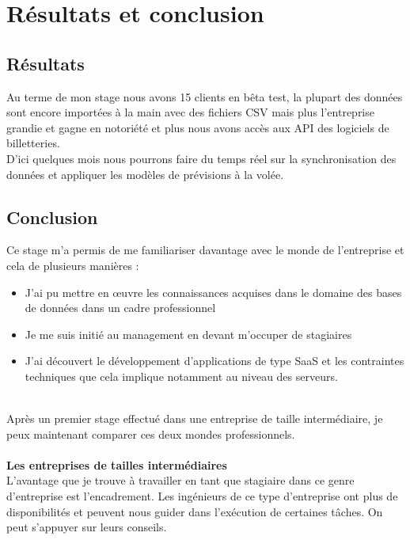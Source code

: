 \chapter{Résultats et conclusion}

\section{Résultats}
Au terme de mon stage nous avons 15 clients en bêta test, la plupart des données sont encore importées à la main avec des fichiers CSV mais plus l'entreprise grandie et gagne en notoriété et plus nous avons accès aux API des logiciels de billetteries.
\\

D'ici quelques mois nous pourrons faire du temps réel sur la synchronisation des données et appliquer les modèles de prévisions à la volée.

\section{Conclusion}
Ce stage m'a permis de me familiariser davantage avec le monde de l'entreprise et cela de plusieurs manières :
	\begin{itemize} 
		\item[\textbullet] J'ai pu mettre en œuvre les connaissances acquises dans le domaine des bases de données dans un cadre professionnel
		\item[\textbullet]Je me suis initié au management en devant m'occuper de stagiaires
		\item[\textbullet]J'ai découvert le développement d'applications de type SaaS et les contraintes techniques que cela implique notamment au niveau des serveurs. 
	\end{itemize} 
\leavevmode \\
Après un premier stage effectué dans une entreprise de taille intermédiaire, je peux maintenant comparer ces deux mondes professionnels.
\\ \\
\textbf{Les entreprises de tailles intermédiaires}
\\
L'avantage que je trouve à travailler en tant que stagiaire dans ce genre d'entreprise est l'encadrement.
Les ingénieurs de ce type d'entreprise ont plus de disponibilités et peuvent nous guider dans l'exécution de certaines tâches. On peut s'appuyer sur leurs conseils. 

